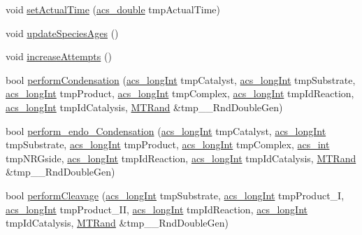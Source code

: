 \begin{DoxyCompactItemize}
\item 
void \hyperlink{classenvironment_a9bc445da3e89d09d4fce11c83f3dedb0}{set\-Actual\-Time} (\hyperlink{acs__headers_8h_ab776853a005fcbf56af0424a2a4dd607}{acs\-\_\-double} tmp\-Actual\-Time)
\item 
void \hyperlink{classenvironment_adab0607255ca5927b69cb6882917e031}{update\-Species\-Ages} ()
\item 
void \hyperlink{classenvironment_aac3eed768b89e3a70017075b68046ede}{increase\-Attempts} ()
\item 
bool \hyperlink{classenvironment_a1baf5512b7e0a8fb6f8f890ba9f99cd1}{perform\-Condensation} (\hyperlink{acs__headers_8h_a19319d75f02db4308bc5c0026d98cd85}{acs\-\_\-long\-Int} tmp\-Catalyst, \hyperlink{acs__headers_8h_a19319d75f02db4308bc5c0026d98cd85}{acs\-\_\-long\-Int} tmp\-Substrate, \hyperlink{acs__headers_8h_a19319d75f02db4308bc5c0026d98cd85}{acs\-\_\-long\-Int} tmp\-Product, \hyperlink{acs__headers_8h_a19319d75f02db4308bc5c0026d98cd85}{acs\-\_\-long\-Int} tmp\-Complex, \hyperlink{acs__headers_8h_a19319d75f02db4308bc5c0026d98cd85}{acs\-\_\-long\-Int} tmp\-Id\-Reaction, \hyperlink{acs__headers_8h_a19319d75f02db4308bc5c0026d98cd85}{acs\-\_\-long\-Int} tmp\-Id\-Catalysis, \hyperlink{class_m_t_rand}{M\-T\-Rand} \&tmp\-\_\-\-\_\-\-Rnd\-Double\-Gen)
\item 
bool \hyperlink{classenvironment_aa7a2cc95d8ba242c805a8fda063b23a7}{perform\-\_\-endo\-\_\-\-Condensation} (\hyperlink{acs__headers_8h_a19319d75f02db4308bc5c0026d98cd85}{acs\-\_\-long\-Int} tmp\-Catalyst, \hyperlink{acs__headers_8h_a19319d75f02db4308bc5c0026d98cd85}{acs\-\_\-long\-Int} tmp\-Substrate, \hyperlink{acs__headers_8h_a19319d75f02db4308bc5c0026d98cd85}{acs\-\_\-long\-Int} tmp\-Product, \hyperlink{acs__headers_8h_a19319d75f02db4308bc5c0026d98cd85}{acs\-\_\-long\-Int} tmp\-Complex, \hyperlink{acs__headers_8h_a8d277355641a098190360234e2ebde35}{acs\-\_\-int} tmp\-N\-R\-Gside, \hyperlink{acs__headers_8h_a19319d75f02db4308bc5c0026d98cd85}{acs\-\_\-long\-Int} tmp\-Id\-Reaction, \hyperlink{acs__headers_8h_a19319d75f02db4308bc5c0026d98cd85}{acs\-\_\-long\-Int} tmp\-Id\-Catalysis, \hyperlink{class_m_t_rand}{M\-T\-Rand} \&tmp\-\_\-\-\_\-\-Rnd\-Double\-Gen)
\item 
bool \hyperlink{classenvironment_aa4ed307a123c402166cfc7f6ed99043a}{perform\-Cleavage} (\hyperlink{acs__headers_8h_a19319d75f02db4308bc5c0026d98cd85}{acs\-\_\-long\-Int} tmp\-Substrate, \hyperlink{acs__headers_8h_a19319d75f02db4308bc5c0026d98cd85}{acs\-\_\-long\-Int} tmp\-Product\-\_\-\-I, \hyperlink{acs__headers_8h_a19319d75f02db4308bc5c0026d98cd85}{acs\-\_\-long\-Int} tmp\-Product\-\_\-\-I\-I, \hyperlink{acs__headers_8h_a19319d75f02db4308bc5c0026d98cd85}{acs\-\_\-long\-Int} tmp\-Id\-Reaction, \hyperlink{acs__headers_8h_a19319d75f02db4308bc5c0026d98cd85}{acs\-\_\-long\-Int} tmp\-Id\-Catalysis, \hyperlink{class_m_t_rand}{M\-T\-Rand} \&tmp\-\_\-\-\_\-\-Rnd\-Double\-Gen)

\end{DoxyCompactItemize}
